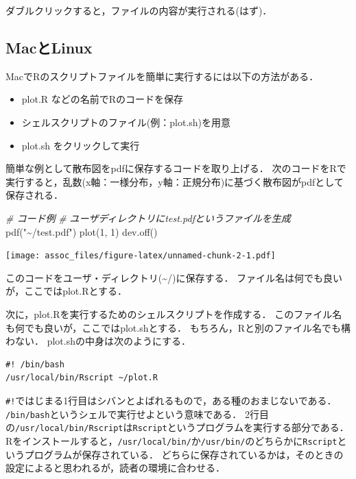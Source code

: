 \documentclass[
]{article}
\newenvironment{Shaded}{\begin{snugshade}}{\end{snugshade}}
\newcommand{\CommentTok}[1]{\textcolor[rgb]{0.56,0.35,0.01}{\textit{#1}}}
\newcommand{\DecValTok}[1]{\textcolor[rgb]{0.00,0.00,0.81}{#1}}
\newcommand{\FunctionTok}[1]{\textcolor[rgb]{0.00,0.00,0.00}{#1}}
\newcommand{\NormalTok}[1]{#1}
\newcommand{\StringTok}[1]{\textcolor[rgb]{0.31,0.60,0.02}{#1}}
\providecommand{\tightlist}{%
  \setlength{\itemsep}{0pt}\setlength{\parskip}{0pt}}
\begin{document}
ダブルクリックすると，ファイルの内容が実行される(はず)．

\hypertarget{macux3068linux}{%
\subsection{MacとLinux}\label{macux3068linux}}

MacでRのスクリプトファイルを簡単に実行するには以下の方法がある．

\begin{itemize}
\tightlist
\item
  plot.R などの名前でRのコードを保存\\
\item
  シェルスクリプトのファイル(例：plot.sh)を用意\\
\item
  plot.sh をクリックして実行
\end{itemize}

簡単な例として散布図をpdfに保存するコードを取り上げる．
次のコードをRで実行すると，乱数(x軸：一様分布，y軸：正規分布)に基づく散布図がpdfとして保存される．

\begin{Shaded}
\begin{Highlighting}[]
\CommentTok{\# コード例}
  \CommentTok{\# ユーザディレクトリにtest.pdfというファイルを生成}
\FunctionTok{pdf}\NormalTok{(}\StringTok{"\textasciitilde{}/test.pdf"}\NormalTok{)}
  \FunctionTok{plot}\NormalTok{(}\DecValTok{1}\NormalTok{, }\DecValTok{1}\NormalTok{)}
\FunctionTok{dev.off}\NormalTok{()}
\end{Highlighting}
\end{Shaded}

\texttt{[image: assoc\_files/figure-latex/unnamed-chunk-2-1.pdf]}

このコードをユーザ・ディレクトリ(\textasciitilde/)に保存する．
ファイル名は何でも良いが，ここではplot.Rとする．

次に，plot.Rを実行するためのシェルスクリプトを作成する．
このファイル名も何でも良いが，ここではplot.shとする．
もちろん，Rと別のファイル名でも構わない．
plot.shの中身は次のようにする．

\begin{verbatim}
#! /bin/bash
/usr/local/bin/Rscript ~/plot.R
\end{verbatim}

\texttt{\#!}ではじまる1行目はシバンとよばれるもので，ある種のおまじないである．
\texttt{/bin/bash}というシェルで実行せよという意味である．
2行目の\texttt{/usr/local/bin/Rscript}は\texttt{Rscript}というプログラムを実行する部分である．
Rをインストールすると，\texttt{/usr/local/bin/}か\texttt{/usr/bin/}のどちらかに\texttt{Rscript}というプログラムが保存されている．
どちらに保存されているかは，そのときの設定によると思われるが，読者の環境に合わせる．
\end{document}
